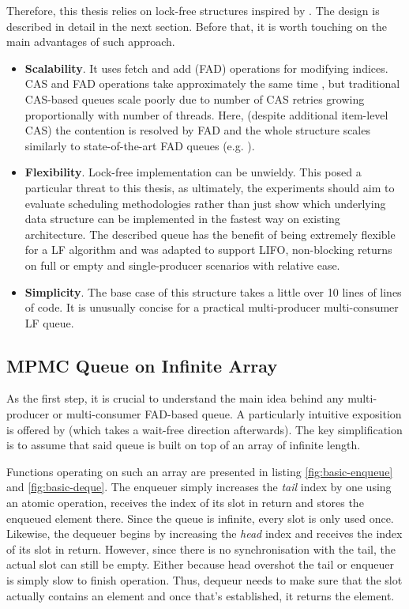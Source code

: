 \documentclass[12pt,a4paper,twoside]{report}
\begin{document}
Therefore, this thesis relies on lock-free structures inspired by \citet{Kappes2021}. The design is described in detail in the next section. Before that, it is worth touching on the main advantages of such approach. 
\begin{itemize}
    \item \textbf{Scalability}. It uses fetch and add (FAD) operations for modifying indices. CAS and FAD operations take approximately the same time \cite{fad-cas-speed}, but traditional CAS-based queues scale poorly due to number of CAS retries growing proportionally with number of threads. Here, (despite additional item-level CAS) the contention is resolved by FAD and the whole structure scales similarly to state-of-the-art FAD queues (e.g. \cite{Yang2016}).
    \item \textbf{Flexibility}. Lock-free implementation can be unwieldy. This posed a particular threat to this thesis, as ultimately, the experiments should aim to evaluate scheduling methodologies rather than just show which underlying data structure can be implemented in the fastest way on existing architecture. The described queue has the benefit of being extremely flexible for a LF algorithm and was adapted to support LIFO, non-blocking returns on full or empty and single-producer scenarios with relative ease.
    \item \textbf{Simplicity}. The base case of this structure takes a little over 10 lines of lines of code. It is unusually concise for a practical multi-producer multi-consumer LF queue. 
\end{itemize}

\subsection{MPMC Queue on Infinite Array}
\label{section:mpmc_queue_on_inf}
As the first step, it is crucial to understand the main idea behind any multi-producer or multi-consumer FAD-based queue. A particularly intuitive exposition is offered by \cite{Yang2016} (which takes a wait-free direction afterwards). The key simplification is to assume that said queue is built on top of an array of infinite length. 

Functions operating on such an array are presented in listing \ref{fig:basic-enqueue} and \ref{fig:basic-deque}. The enqueuer simply increases the \textit{tail} index by one using an atomic operation, receives the index of its slot in return and stores the enqueued element there. Since the queue is infinite, every slot is only used once. Likewise, the dequeuer begins by increasing the \textit{head} index and receives the index of its slot in return. However, since there is no synchronisation with the tail, the actual slot can still be empty. Either because head overshot the tail or enqueuer is simply slow to finish operation. Thus, dequeur needs to make sure that the slot actually contains an element and once that's established, it returns the element. 
\end{document}
